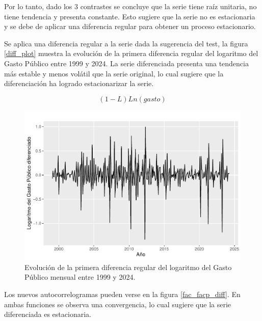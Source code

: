 \documentclass[
  12pt,
]{article}
\begin{document}
Por lo tanto, dado los 3 contrastes se concluye que la serie tiene raíz
unitaria, no tiene tendencia y presenta constante. Esto sugiere que la
serie no es estacionaria y se debe de aplicar una diferencia regular
para obtener un proceso estacionario.

Se aplica una diferencia regular a la serie dada la sugerencia del test,
la figura \ref{diff_plot} muestra la evolución de la primera diferencia
regular del logaritmo del Gasto Público entre 1999 y 2024. La serie
diferenciada presenta una tendencia más estable y menos volátil que la
serie original, lo cual sugiere que la diferenciación ha logrado
estacionarizar la serie.

\[(1-L)Ln(gasto)\]

\begin{figure}[H]

{\centering \includegraphics[width=0.75\linewidth]{informe_files/figure-latex/unnamed-chunk-3-1} 

}

\caption{\label{diff_plot} Evolución de la primera diferencia regular del logaritmo del Gasto Público mensual entre 1999 y 2024.}\label{fig:unnamed-chunk-3}
\end{figure}

Los nuevos autocorrelogramas pueden verse en la figura
\ref{fac_facp_diff}. En ambas funciones se observa una convergencia, lo
cual sugiere que la serie diferenciada es estacionaria.
\end{document}
